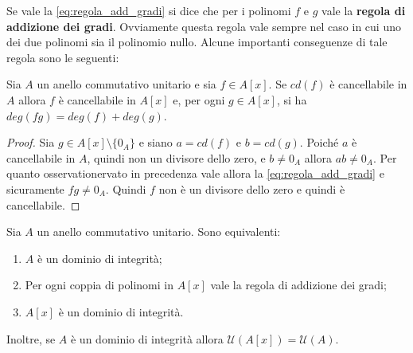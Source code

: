 Se vale la \ref{eq:regola_add_gradi} si dice che per i polinomi $f$ e $g$ vale la \textbf{regola di addizione dei gradi}. Ovviamente questa regola vale sempre nel caso in cui uno dei due polinomi sia il polinomio nullo. Alcune importanti conseguenze di tale regola sono le seguenti:


\begin{corolbox}
	Sia $A$ un anello commutativo unitario e sia $f \in A[x]$. Se $cd(f)$ è cancellabile in $A$ allora $f$ è cancellabile in $A[x]$ e, per ogni $g \in A[x]$, si ha $deg(fg)=deg(f) +deg(g)$.
\end{corolbox}


\begin{proof}
	Sia $g \in A[x]\setminus \{0_{A}\}$ e siano $a=cd(f)$ e $b=cd(g)$. Poiché $a$ è cancellabile in $A$, quindi non un divisore dello zero, e $b \neq 0_{A}$ allora $ab \neq 0_{A}$. Per quanto osservationervato in precedenza vale allora la \ref{eq:regola_add_gradi} e sicuramente $fg \neq 0_{A}$. Quindi $f$ non è un divisore dello zero e quindi è cancellabile.
\end{proof}


\begin{propbox}
	Sia $A$ un anello commutativo unitario. Sono equivalenti:
	\begin{enumerate}
		\item $A$ è un dominio di integrità;
		\item Per ogni coppia di polinomi in $A[x]$ vale la regola di addizione dei gradi;
		\item $A[x]$ è un dominio di integrità.
	\end{enumerate}
	Inoltre, se $A$ è un dominio di integrità allora $\mathcal{U}(A[x])=\mathcal{U}(A)$.
\end{propbox}


